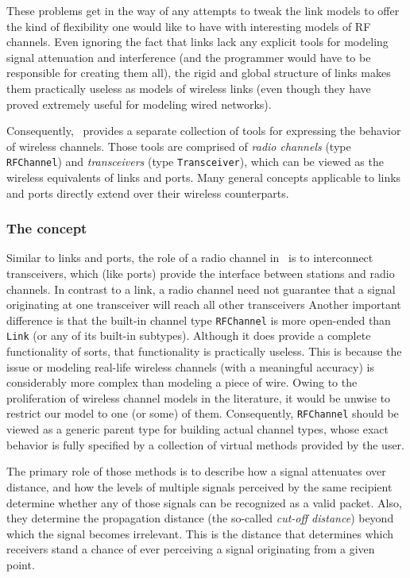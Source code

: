 These problems get in the way of any attempts to tweak the link models to
offer the kind of flexibility one would like to have with interesting models
of RF channels.
Even ignoring the fact that links lack any explicit tools for modeling
signal attenuation and interference (and the programmer would have to be
responsible for creating them all), the rigid and global structure of links
makes them practically useless as models of wireless links (even though they
have proved extremely useful for modeling wired networks).

Consequently, \smurph\ provides a separate collection of tools for expressing
the behavior of wireless channels.
Those tools are comprised of {\em radio channels\/} (type {\tt RFChannel}) and
{\em transceivers\/} (type {\tt Transceiver}),
which can be viewed as the wireless equivalents of links and ports.
Many general concepts applicable to links and ports directly extend over
their wireless counterparts.

\subsubsection{The concept}
\label{rm_to_rf_co}

Similar to links and ports, the role of a radio channel in \smurph\ is
to interconnect transceivers, which (like ports) provide the interface between
stations and radio channels.
In contrast to a link, a radio channel need not guarantee that
a signal originating at one transceiver will reach all other transceivers
Another important difference is that the built-in channel type {\tt RFChannel}
is more open-ended than {\tt Link} (or any of its built-in subtypes).
Although it does provide a complete functionality of sorts, that functionality
is practically useless.
This is because the issue or modeling real-life wireless channels (with a
meaningful accuracy) is considerably more complex than modeling a piece of
wire.
Owing to the proliferation of wireless channel models in the literature,
it would be unwise to restrict our model to one (or some) of them.
Consequently, {\tt RFChannel} should be viewed as a generic parent type for
building actual channel types, whose exact behavior is fully specified by
a collection of virtual methods provided by the user.

The primary role of those methods is to describe how a signal attenuates
over distance, and how the levels of multiple signals perceived by the same
recipient determine whether any of those signals can be recognized as a
valid packet.
Also, they determine the propagation distance (the so-called {\em cut-off
distance\/}) beyond which the signal becomes irrelevant.
This is the distance that determines which receivers stand a chance of ever
perceiving a signal originating from a given point.

